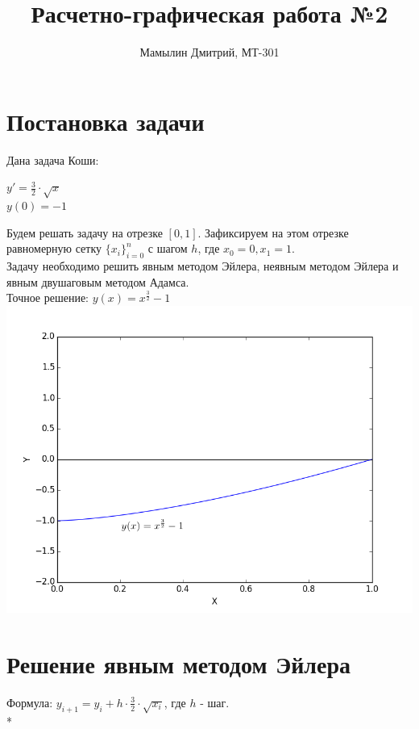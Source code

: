 \documentclass[12pt,a4paper]{article}
\title{Расчетно-графическая работа №2}
\author{Мамылин Дмитрий, МТ-301}
\begin{document}

\maketitle
\thispagestyle{empty}

\newpage
\thispagestyle{empty}

    \section*{Постановка задачи}
        Дана задача Коши:\\
        \begin{center}
            $y' = \frac{3}{2}\cdot\sqrt{x}$\\
            $y(0) = -1$
        \end{center}\smallskip
        Будем решать задачу на отрезке $[0, 1]$. Зафиксируем на этом отрезке
        равномерную сетку $\{x_{i}\}_{i=0}^{n}$ с шагом $h$, где $x_{0} = 0, x_{1} = 1$.\\
        Задачу необходимо решить явным методом Эйлера, неявным методом Эйлера и
        явным двушаговым методом Адамса.\\
        Точное решение: $y(x) = x^{\frac{3}{2}} - 1$\\
        \includegraphics[scale=0.5]{exactSolutionGraph}
        
    \section*{Решение явным методом Эйлера}
        Формула: $y_{i+1} = y_{i} + h \cdot \frac{3}{2}\cdot\sqrt{x_{i}}$, где $h$ - шаг.\\*
\end{document}
